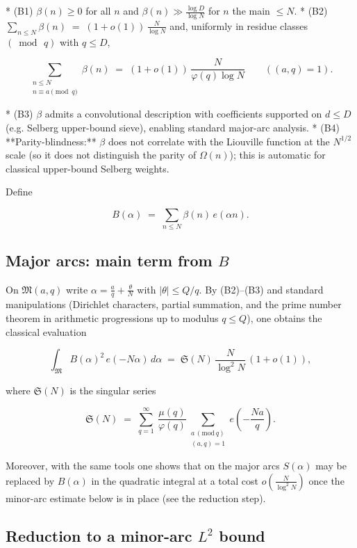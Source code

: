 \documentclass[11pt]{article}
\theoremstyle{definition}
\theoremstyle{remark}
\begin{document}
* (B1) $\beta(n)\ge 0$ for all $n$ and $\beta(n)\gg \tfrac{\log D}{\log N}$ for $n$ the main $\le N$.
* (B2) $\displaystyle \sum_{n\le N}\beta(n)\;=\;(1+o(1))\,\frac{N}{\log N}$ and, uniformly in residue classes $(\bmod\,q)$ with $q\le D$,

$$
\sum_{\substack{n\le N\\ n\equiv a\!\!\!\pmod q}}\beta(n)
\;=\;(1+o(1))\,\frac{N}{\varphi(q)\log N}\qquad ((a,q)=1).
$$

* (B3) $\beta$ admits a convolutional description with coefficients supported on $d\le D$ (e.g. Selberg upper-bound sieve), enabling standard major-arc analysis.
* (B4) **Parity-blindness:** $\beta$ does not correlate with the Liouville function at the $N^{1/2}$ scale (so it does not distinguish the parity of $\Omega(n)$); this is automatic for classical upper-bound Selberg weights.

Define

$$
B(\alpha)\;=\;\sum_{n\le N}\beta(n)\,e(\alpha n).
$$


\subsection*{Major arcs: main term from $B$}

On $\mathfrak M(a,q)$ write $\alpha=\tfrac{a}{q}+\tfrac{\theta}{N}$ with
$|\theta|\le Q/q$. By (B2)–(B3) and standard manipulations (Dirichlet characters, partial summation, and the prime number theorem in arithmetic progressions up to modulus $q\le Q$), one obtains the classical evaluation

$$
\int_{\mathfrak M} B(\alpha)^2\,e(-N\alpha)\,d\alpha
\;=\;\mathfrak S(N)\,\frac{N}{\log^2 N}\,(1+o(1)),
$$

where $\mathfrak S(N)$ is the singular series

$$
\mathfrak S(N)\;=\;\sum_{q=1}^{\infty}\ \frac{\mu(q)}{\varphi(q)}\!
\sum_{\substack{a\,(\mathrm{mod}\,q)\\(a,q)=1}} e\!\left(-\frac{Na}{q}\right).
$$

Moreover, with the same tools one shows that on the major arcs $S(\alpha)$ may be replaced by $B(\alpha)$ in the quadratic integral at a total cost $o\!\left(\tfrac{N}{\log^2 N}\right)$ once the minor-arc estimate below is in place (see the reduction step).


\subsection*{Reduction to a minor-arc $L^2$ bound}
\end{document}
